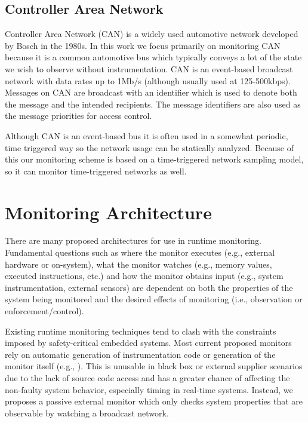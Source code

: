 \documentclass[]{../llncs/llncs}
\begin{document}
\subsection{Controller Area Network}
Controller Area Network (CAN) is a widely used automotive network developed by Bosch in the 1980s. 
In this work we focus primarily on monitoring CAN because it is a common automotive bus which typically conveys a lot of the state we wish to observe without instrumentation.
%
CAN is an event-based broadcast network with data rates up to 1Mb/s (although usually used at 125-500kbps). Messages on CAN are broadcast with an identifier which is used to denote both the message and the intended recipients. The message identifiers are also used as the message priorities for access control.

Although CAN is an event-based bus it is often used in a somewhat periodic, time triggered way so the network usage can be statically analyzed. Because of this our monitoring scheme is based on a time-triggered network sampling model, so it can monitor time-triggered networks as well.

\section{Monitoring Architecture}
There are many proposed architectures for use in runtime monitoring. Fundamental questions such as where the monitor executes (e.g., external hardware or on-system), what the monitor watches (e.g., memory values, executed instructions, etc.) and how the monitor obtains input (e.g., system instrumentation, external sensors) are dependent on both the properties of the system being monitored and the desired effects of monitoring (i.e., observation or enforcement/control).  

Existing runtime monitoring techniques tend to clash with the constraints imposed by safety-critical embedded systems. 
Most current proposed monitors rely on automatic generation of instrumentation code or generation of the monitor itself (e.g., \cite{Havelund2002, Pike2011}).
This is unusable in black box or external supplier scenarios due to the lack of source code access and has a greater chance of affecting the non-faulty system behavior, especially timing in real-time systems.
Instead, we proposes a passive external monitor which only checks system properties that are observable by watching a broadcast network.
\end{document}
